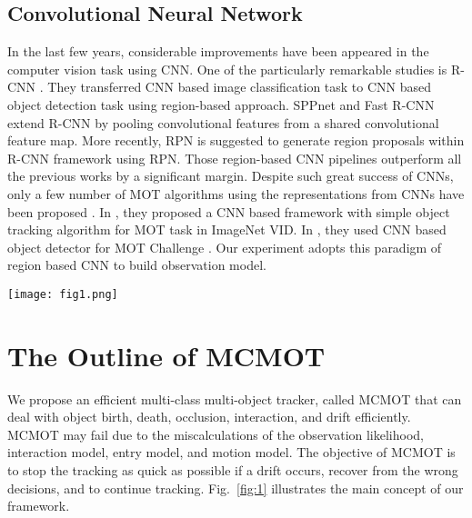 \documentclass[runningheads]{llncs}
\begin{document}
\subsection{Convolutional Neural Network}

In the last few years, considerable improvements have been appeared in the computer vision task using CNN. One of the particularly remarkable studies is R-CNN \cite{Ref34}. They transferred CNN based image classification task to CNN based object detection task using region-based approach. SPPnet \cite{Ref35} and Fast R-CNN \cite{Ref36} extend R-CNN by pooling convolutional features from a shared convolutional feature map. More recently, RPN \cite{Ref28} is suggested to generate region proposals within R-CNN framework using RPN. Those region-based CNN pipelines outperform all the previous works by a significant margin. Despite such great success of CNNs, only a few number of MOT algorithms using the representations from CNNs have been proposed \cite{Ref20,Ref21,Ref22}. In \cite{Ref20,Ref21}, they proposed a CNN based framework with simple object tracking algorithm for MOT task in ImageNet VID. In \cite{Ref22}, they used CNN based object detector for MOT Challenge \cite{Ref32}. Our experiment adopts this paradigm of region based CNN to build observation model.

\begin{figure*}
\centering
  \texttt{[image: fig1.png]}
\caption{MCMOT framework has four major steps: (a) Likelihood calculation based on observation models, (b) Track segment creation, (c) Changing point detection, and (d) Trajectory combination. The drifts in segments are effectively controlled by changing point detection algorithm with forward-backward validation.}
\label{fig:1}
\end{figure*}

\section{The Outline of MCMOT}

We propose an efficient multi-class multi-object tracker, called MCMOT that can deal with object birth, death, occlusion, interaction, and drift efficiently. MCMOT may fail due to the miscalculations of the observation likelihood, interaction model, entry model, and motion model. The objective of MCMOT is to stop the tracking as quick as possible if a drift occurs, recover from the wrong decisions, and to continue tracking. Fig.~\ref{fig:1} illustrates the main concept of our framework.
\end{document}
